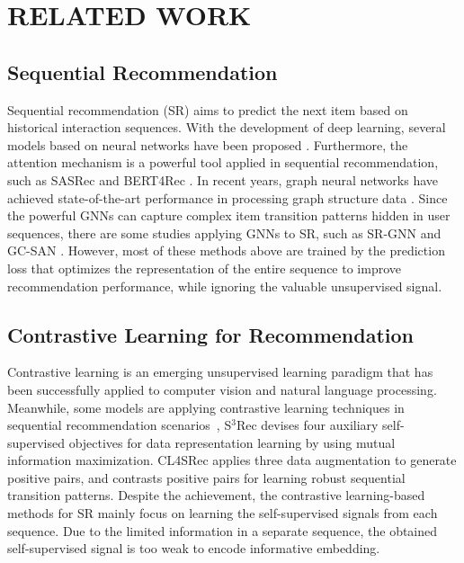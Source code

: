 \documentclass[runningheads]{llncs}
\begin{document}
\vspace{-15pt}
\section{RELATED WORK}
\vspace{-5pt}
\subsection{Sequential Recommendation}
\vspace{-5pt}

Sequential recommendation (SR) aims to predict the next item based on historical interaction sequences. 
With the development of deep learning, several models based on neural networks have been proposed \cite{gru4rec,caser}. Furthermore, the attention mechanism is a powerful tool applied in sequential recommendation, such as SASRec \cite{SASRec} and BERT4Rec \cite{bert4rec}. In recent years, graph neural networks have achieved state-of-the-art performance in processing graph structure data \cite{h1,h2,k1,k2}. 
Since the powerful GNNs can capture complex item transition patterns hidden in user sequences, there are some studies applying GNNs to SR, such as SR-GNN \cite{srgnn} and GC-SAN \cite{gcsan}.
However, most of these methods above are trained by the prediction loss that optimizes the representation of the entire sequence to improve recommendation performance, while ignoring the valuable unsupervised signal. 
 

\vspace{-10pt}
\subsection{Contrastive Learning for Recommendation}
\vspace{-5pt}
Contrastive learning is an emerging unsupervised learning paradigm that has been successfully applied to computer vision and natural language processing. Meanwhile, some models are applying contrastive learning techniques in sequential recommendation scenarios~\cite{s3rec,cl4rec,icl4sr,clcs}, S\(^3\)Rec \cite{s3rec} devises four auxiliary self-supervised objectives for data representation learning by using mutual information maximization. CL4SRec \cite{cl4rec} applies three data augmentation to generate positive pairs, and contrasts positive pairs for learning robust sequential transition patterns.
Despite the achievement, the contrastive learning-based methods for SR mainly focus on learning the self-supervised signals from each sequence. Due to the limited information in a separate sequence, the obtained self-supervised signal is too weak to encode informative embedding.
\vspace{-10pt}
\end{document}
